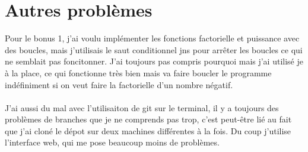 \documentclass{article}
\begin{document}
\newpage

\section{Autres problèmes}

Pour le bonus 1, j'ai voulu implémenter les fonctions factorielle et puissance avec des boucles, mais j'utilisais le saut conditionnel jns pour arrêter les boucles ce qui ne semblait pas foncitonner. J'ai toujours pas compris pourquoi mais j'ai utilisé je à la place, ce qui fonctionne très bien mais va faire boucler le programme indéfiniment si on veut faire la factorielle d'un nombre négatif.
\\
\\
J'ai aussi du mal avec l'utilisaiton de git sur le terminal, il y a toujours des problèmes de branches que je ne comprends pas trop, c'est peut-être lié au fait que j'ai cloné le dépot sur deux machines différentes à la fois. Du coup j'utilise l'interface web, qui me pose beaucoup moins de problèmes.
\end{document}
